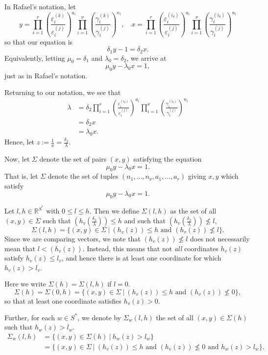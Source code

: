 In Rafael's notation, let
\[y =  \prod_{i = 1}^r\left( \frac{\varepsilon_i^{(k)}}{\varepsilon_i^{(j)}}\right)^{a_i}\prod_{i = 1}^{\nu} \left( \frac{\gamma_i^{(k)}}{\gamma_i^{(j)}}\right)^{n_i}, \quad 
x = \prod_{i = 1}^{r}\left( \frac{\varepsilon_i^{(i_0)}}{\varepsilon_i^{(j)}}\right)^{a_i} \prod_{i = 1}^{\nu} \left( \frac{\gamma_i^{(i_0)}}{\gamma_i^{(j)}}\right)^{n_i}\]
so that our equation is
\[\delta_1y - 1 = \delta_2x.\]
Equivalently, letting $\mu_0 = \delta_1$ and $\lambda_0 = \delta_2$, we arrive at
\[\mu_0y - \lambda_0x = 1,\]
just as in Rafael's notation. 

Returning to our notation, we see that 
\begin{align*}
\lambda 	& = \delta_2 \prod_{i = 1}^{r}\left( \frac{\varepsilon_i^{(i_0)}}{\varepsilon_i^{(j)}}\right)^{a_i} \prod_{i = 1}^{\nu} \left( \frac{\gamma_i^{(i_0)}}{\gamma_i^{(j)}}\right)^{n_i}\\
		& = \delta_2 x\\
		& = \lambda_0 x.
\end{align*}
Hence, let $z:= \frac{1}{x} = \frac{\delta_2}{\lambda}$.

Now, let $\Sigma$ denote the set of pairs $(x,y)$ satisfying the equation 
\[\mu_0y - \lambda_0x = 1.\]
That is, let $\Sigma$ denote the set of tuples $(n_1, \dots, n_{\nu}, a_1, \dots, a_r)$ giving $x,y$ which satisfy
\[\mu_0y - \lambda_0x = 1.\]

Let $l,h\in\mathbb{R}^{S^*}$ with $0\leq l\leq h$. Then we define $\Sigma(l,h)$ as the set of all $(x,y)\in \Sigma$ such that $\left(h_v\left(\frac{\delta_2}{\lambda}\right)\right)\leq h$ and such that $\left(h_v\left(\frac{\delta_2}{\lambda}\right)\right)\nleq l$, 
\[\Sigma(l,h) = \{(x,y) \in \Sigma \ | \ (h_v(z))\leq h \text{ and } (h_v(z))\nleq l\}.\]
Since we are comparing vectors, we note that $(h_v(z))\nleq l$ does not necessarily mean that $l < (h_v(z))$. Instead, this means that not \textit{all} coordinates $h_v(z)$ satisfy $h_v(z) \leq l_v$, and hence there is at least one coordinate for which $h_v(z) > l_v$.

Here we write $\Sigma(h)=\Sigma(l,h)$ if $l=0$.  
\[\Sigma(h) = \Sigma(0,h)= \{(x,y) \in \Sigma \ | \ (h_v(z))\leq h \text{ and }  (h_v(z))\nleq 0 \},\]
so that at least one coordinate satisfies $h_v(z) > 0$.

Further, for each $w\in S^*$, we denote by $\Sigma_w(l,h)$ the set of all $(x,y)\in\Sigma(h)$ such that $h_w(z)>l_w$. 
\begin{align*}
\Sigma_w(l,h)	& = \{(x,y) \in \Sigma(h) \ | \ h_w(z)>l_w \} \\
			& = \{(x,y) \in \Sigma \ | \ (h_v(z))\leq h \text{ and }  (h_v(z))\nleq 0 \text{ and } h_w(z)>l_w\}.
\end{align*}

